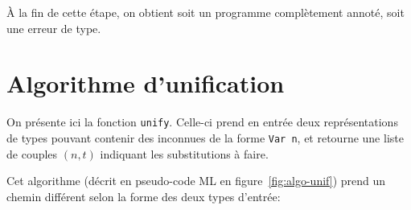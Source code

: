 À la fin de cette étape, on obtient soit un programme complètement annoté, soit
une erreur de type.

\section{Algorithme d'unification}
\label{sec:unif}

On présente ici la fonction \texttt{unify}. Celle-ci prend en entrée deux
représentations de types pouvant contenir des inconnues de la forme \texttt{Var
n}, et retourne une liste de couples $(n, t)$ indiquant les substitutions à
faire.


Cet algorithme (décrit en pseudo-code ML en figure~\ref{fig:algo-unif}) prend un
chemin différent selon la forme des deux types d'entrée:


